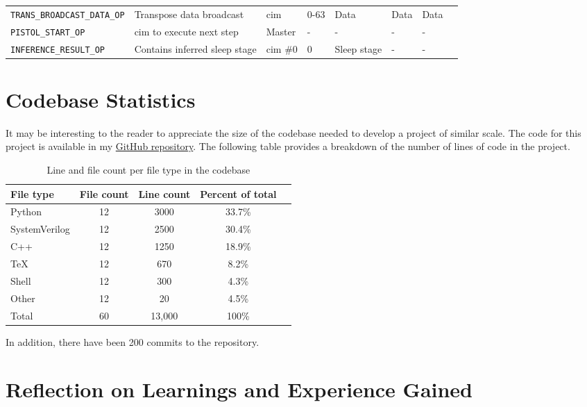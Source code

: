 \begin{sidewaystable}
\begin{tabular}{@{} p{6.5cm}lllllll @{}}
        \texttt{TRANS\_BROADCAST\_DATA\_OP}         & Transpose data broadcast          & \ac{cim}      & 0-63          & Data              & Data              & Data \\
        \texttt{PISTOL\_START\_OP}                  & \ac{cim} to execute next step     & Master        & -             & -                 & -                 & - \\
        \texttt{INFERENCE\_RESULT\_OP}              & Contains inferred sleep stage     & \ac{cim} \#0  & 0             & Sleep stage       & -                 & - \\
    \end{tabular}
    \label{tab:bus_ops}
\end{sidewaystable}

\section{Codebase Statistics}
It may be interesting to the reader to appreciate the size of the codebase needed to develop a project of similar scale. The code for this project is available 
in my \href{https://github.com/TristanRobitaille/engsci-thesis}{GitHub repository}. The following table provides a breakdown of the number of lines of code in the project.

\begin{table}[ht]
    \centering
    \renewcommand{\arraystretch}{1.2} %
    \setlength{\arrayrulewidth}{1.5pt} %
    \caption{Line and file count per file type in the codebase}
    \begin{tabular}{@{} p{4cm}cccr @{}}
        \toprule
        File type       & File count    & Line count    & Percent of total & \\\midrule
        Python          & 12            & 3000          & 33.7\% \\
        SystemVerilog   & 12            & 2500          & 30.4\% \\
        C++             & 12            & 1250          & 18.9\% \\
        TeX             & 12            & 670           & 8.2\%  \\
        Shell           & 12            & 300           & 4.3\%  \\
        Other           & 12            & 20            & 4.5\%  \\\midrule
        Total           & 60            & 13,000        & 100\%  \\
        \hline
    \end{tabular}
    \label{tab:line_cnt}
\end{table}

In addition, there have been 200 commits to the repository.

\newpage
\section{Reflection on Learnings and Experience Gained}